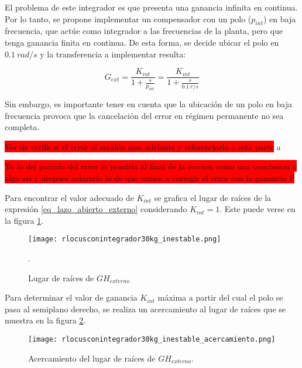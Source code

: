 El problema de este integrador es que presenta una ganancia infinita en continua. Por lo tanto, se propone implementar un compensador con un polo ($p_{int}$) en baja frecuencia, que actúe como integrador a las frecuencias de la planta, pero que tenga ganancia finita en continua. De esta forma, se decide ubicar el polo en $0.1\:rad/s$ y la transferencia a implementar resulta:

\begin{equation}
	G_{ext}=\frac{K_{int}}{1+\frac{s}{p_{int}}}=\frac{K_{int}}{1+\frac{s}{0.1\:r/s}}	
\end{equation}

Sin embargo, es importante tener en cuenta que la ubicación de un polo en baja frecuencia provoca que la cancelación del error en régimen permanente no sea completa.

\colorbox{red}{Ver de verificar el error al escalón mas adelante y referenciarlo a esta parte}
a

\colorbox{red}{Yo lo del parrafo del error lo pondria al final de la seccion como  una conclusion o algo asi y despues aclararia lo de que vamos a corregir el error con la ganancia F}


Para encontrar el valor adecuado de $K_{int}$ se grafica el lugar de raíces de la expresión \ref{eq_lazo_abierto_externo} considerando $K_{int}=1$. Este puede verse en la figura \ref{fig:lugar-de-raices-con-integrador-analog_inestable}.

\begin{figure}[H]
	\centering
	\texttt{[image: rlocusconintegrador30kg\_inestable.png]}
	\caption{Lugar de raíces de $GH_{externo}$}.
	\label{fig:lugar-de-raices-con-integrador-analog_inestable}
\end{figure}

Para determinar el valor de ganancia $K_{int}$ máxima a partir del cual el polo se pasa al semiplano derecho, se realiza un acercamiento al lugar de raíces que se muestra en la figura \ref{fig:lugar-de-raices-con-integrador-analog_inestable_acercamiento}. 

\begin{figure}[H]
	\centering
	\texttt{[image: rlocusconintegrador30kg\_inestable\_acercamiento.png]}
	\caption{Acercamiento del lugar de raíces de $GH_{externo}$.}
	\label{fig:lugar-de-raices-con-integrador-analog_inestable_acercamiento}
\end{figure}

